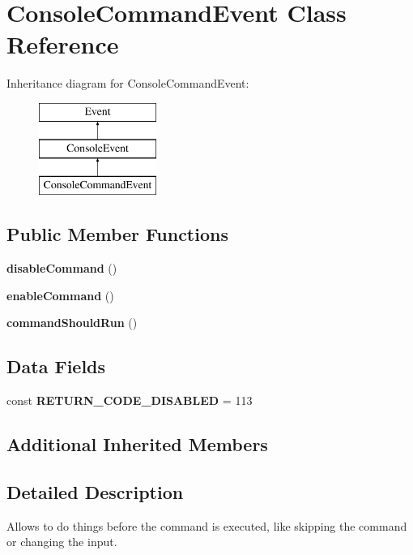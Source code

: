 \section{Console\+Command\+Event Class Reference}
\label{class_symfony_1_1_component_1_1_console_1_1_event_1_1_console_command_event}
Inheritance diagram for Console\+Command\+Event\+:\begin{figure}[H]
\begin{center}
\leavevmode
\includegraphics[height=3.000000cm]{class_symfony_1_1_component_1_1_console_1_1_event_1_1_console_command_event}
\end{center}
\end{figure}
\subsection*{Public Member Functions}
\begin{DoxyCompactItemize}
\item 
{\bf disable\+Command} ()
\item 
{\bf enable\+Command} ()
\item 
{\bf command\+Should\+Run} ()
\end{DoxyCompactItemize}
\subsection*{Data Fields}
\begin{DoxyCompactItemize}
\item 
const {\bf R\+E\+T\+U\+R\+N\+\_\+\+C\+O\+D\+E\+\_\+\+D\+I\+S\+A\+B\+L\+E\+D} = 113
\end{DoxyCompactItemize}
\subsection*{Additional Inherited Members}


\subsection{Detailed Description}
Allows to do things before the command is executed, like skipping the command or changing the input.

